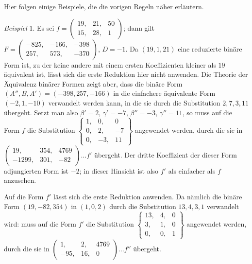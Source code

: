 Hier folgen einige Beispiele, die die vorigen Regeln näher erläutern.

\emph{Beispiel} 1. Es sei \(f=\left(\begin{smallmatrix}19,&21,&50\\15,&28,&1\end{smallmatrix}\right)\); dann gilt \(F=\left(\begin{smallmatrix}-825,&-166,&-398\\257,&573,&-370\end{smallmatrix}\right)\), \(D=-1\). Da \((19,1,21)\) eine reduzierte binäre Form ist, zu der keine andere mit einem ersten Koeffizienten kleiner als \(19\) äquivalent ist, lässt sich die erste Reduktion hier nicht anwenden. Die Theorie der Äquivalenz binärer Formen zeigt aber, dass die binäre Form
\((A'',B,A')=(-398,257,-166)\) in die einfachere äquivalente Form \((-2,1,-10)\) verwandelt werden kann, in die sie durch die Substitution \(2,7,3,11\) übergeht. Setzt man also \(\beta'=2\), \(\gamma'=-7\), \(\beta''=-3\), \(\gamma''=11\), so muss auf die Form \(f\) die Substitution \(\left\{\begin{smallmatrix}1,&0,&0\\0,&2,&-7\\0,&-3,&11\end{smallmatrix}\right\}\) angewendet werden, durch die sie in \(\left(\begin{smallmatrix}19,&354,&4769\\-1299,&301,&-82\end{smallmatrix}\right)\ldots f'\) übergeht. Der dritte Koeffizient der dieser Form adjungierten Form ist \(-2\); in dieser Hinsicht ist also \(f'\) als einfacher als \(f\) anzusehen.

Auf die Form \(f'\) lässt sich die erste Reduktion anwenden. Da nämlich die binäre Form \((19,-82,354)\) in \((1,0,2)\) durch die Substitution \(13,4,3,1\) verwandelt wird: muss auf die Form \(f'\) die Substitution \(\left\{\begin{smallmatrix}13,&4,&0\\3,&1,&0\\0,&0,&1\end{smallmatrix}\right\}\) angewendet werden, durch die sie in \(\left(\begin{smallmatrix}1,&2,&4769\\-95,&16,&0\end{smallmatrix}\right)\ldots f''\) übergeht.

